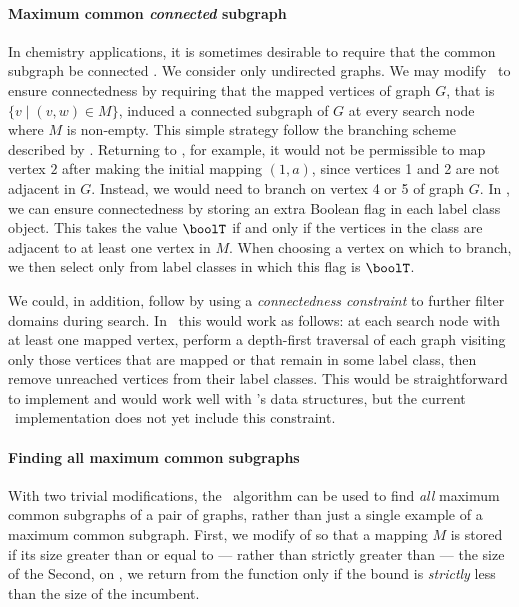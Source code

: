 \paragraph{Maximum common \emph{connected} subgraph} In chemistry applications,
it is sometimes desirable to require that the common subgraph be connected
\citep{Ehrlich:2011}. We consider only undirected graphs. We may modify \McSplit\
to ensure connectedness by
requiring that the mapped vertices of graph $G$, that is $\{v \mid (v,w) \in M\}$,
induced a connected
subgraph of $G$ at every search node where $M$ is non-empty.
This simple strategy follow the branching scheme
described by \citet{DBLP:conf/mco/VismaraV08}.
Returning to , for example, it would not be permissible
to map vertex $2$ after making the initial mapping $(1,a)$, since vertices
1 and 2 are not adjacent in $G$.  Instead, we would need to branch on vertex
4 or 5 of graph $G$.
In \McSplit, we can ensure connectedness by storing an extra
Boolean flag in  each label class object.  This takes the value $\boolT$ if and only if the
vertices in the class are adjacent to at least one vertex in $M$.  When
choosing a vertex on which to branch, we then select only from label
classes in which this flag is $\boolT$.

We could, in addition, follow \citet{DBLP:conf/cp/NdiayeS11} by using a
\emph{connectedness constraint} to further filter domains during search.
In \McSplit\ this would work as follows: at
each search node with at least one mapped vertex, perform a depth-first
traversal of each graph visiting only those vertices that are mapped or that
remain in some label class, then remove unreached vertices from their label classes.
This would be straightforward to implement and would work well with \McSplit's
data structures, but the current \McSplit\ implementation does not yet include this
constraint.

\paragraph{Finding all maximum common subgraphs}
With two trivial modifications, the \McSplit\ algorithm can be used to find
\emph{all} maximum common subgraphs of a pair of graphs, rather than just a single
example of a maximum common subgraph.
First, we modify  of  so that
a mapping $M$ is stored if its size greater than or equal to --- rather than
strictly greater than --- the size of the \DIFdel{incumbent.}  Second, on ,
we return from the function only if the bound is \emph{strictly} less than the
size of the incumbent.

